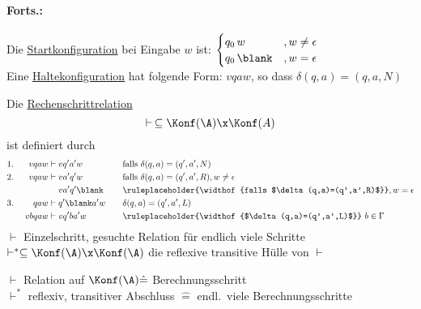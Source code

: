\paragraph{Forts.:} Die \underline{Startkonfiguration} bei Eingabe $w$ ist:
$\begin{cases}
q_0\,w &, w\neq\epsilon\\
q_0\,\blank &, w=\epsilon
\end{cases}$\\
Eine \underline{Haltekonfiguration} hat folgende Form: $vqaw$, so dass $\delta(q,a)=(q,a,N)$

\begin{Def}[name={[Rechenschrittrelation]}] %
	Die \underline{Rechenschrittrelation}
	\[ \vdash\, \subseteq \Konf(\A)\x\Konf(A) \]
	ist definiert durch
	\begin{alignat*}{3}
		1.&\ & v qaw &\vdash v q'a'w &\quad& \text{falls }\delta(q,a)=(q',a',N)\\
		2.&& v qaw &\vdash v a'q'w && \text{falls }\delta(q,a)=(q',a',R), w\neq \epsilon\\
		&&&\phantom{{}\vdash{}} v a'q'\blank && \ruleplaceholder{\widthof{falls $\delta(q,a)=(q',a',R)$}}, w=\epsilon\\
		3.&& qaw &\vdash q'\blank a'w && \delta(q,a)=(q',a',L)\\
		&& vbqaw &\vdash vq'ba'w && \ruleplaceholder{\widthof{$\delta(q,a)=(q',a',L)$}}\  b\in\Gamma
	\end{alignat*}
	$\vdash$ Einzelschritt, gesuchte Relation für endlich viele Schritte \smallskip\\
	$\vdash^* \subseteq \Konf(\A) \x \Konf(\A)$ die reflexive transitive Hülle von $\vdash$
\end{Def}


$\vdash$ Relation auf $\Konf(\A)\hat=$ Berechnungsschritt\\
$\vdash^*$ reflexiv, transitiver Abschluss $\hat=$ endl.\ viele Berechnungsschritte
%
